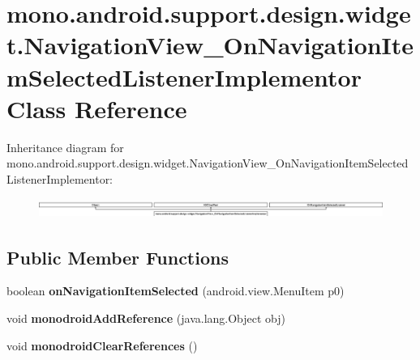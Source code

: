 \hypertarget{classmono_1_1android_1_1support_1_1design_1_1widget_1_1_navigation_view___on_navigation_item_selected_listener_implementor}{}\section{mono.\+android.\+support.\+design.\+widget.\+Navigation\+View\+\_\+\+On\+Navigation\+Item\+Selected\+Listener\+Implementor Class Reference}
\label{classmono_1_1android_1_1support_1_1design_1_1widget_1_1_navigation_view___on_navigation_item_selected_listener_implementor}
Inheritance diagram for mono.\+android.\+support.\+design.\+widget.\+Navigation\+View\+\_\+\+On\+Navigation\+Item\+Selected\+Listener\+Implementor\+:\begin{figure}[H]
\begin{center}
\leavevmode
\includegraphics[height=0.640366cm]{classmono_1_1android_1_1support_1_1design_1_1widget_1_1_navigation_view___on_navigation_item_selected_listener_implementor}
\end{center}
\end{figure}
\subsection*{Public Member Functions}
\begin{DoxyCompactItemize}
\item 
\mbox{\label{classmono_1_1android_1_1support_1_1design_1_1widget_1_1_navigation_view___on_navigation_item_selected_listener_implementor_a7a1944dd1ff571ff377bd69245bdf594}} 
boolean {\bfseries on\+Navigation\+Item\+Selected} (android.\+view.\+Menu\+Item p0)
\item 
\mbox{\label{classmono_1_1android_1_1support_1_1design_1_1widget_1_1_navigation_view___on_navigation_item_selected_listener_implementor_a8bc0b14e6513bff83883d834a9db2471}} 
void {\bfseries monodroid\+Add\+Reference} (java.\+lang.\+Object obj)
\item 
\mbox{\label{classmono_1_1android_1_1support_1_1design_1_1widget_1_1_navigation_view___on_navigation_item_selected_listener_implementor_a5afbcfa48efc997f1eaad7b5f3018d18}} 
void {\bfseries monodroid\+Clear\+References} ()
\end{DoxyCompactItemize}

